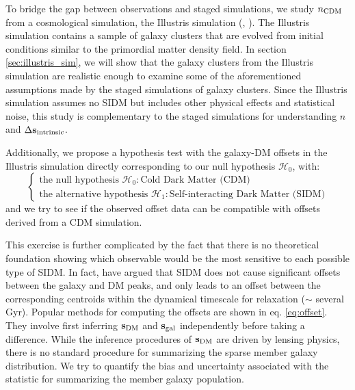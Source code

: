 To bridge the gap between observations and staged simulations, we
study $n_{\rm CDM}$ from a cosmological simulation, the Illustris simulation
(\citealt{Vogelsberger2014}, \citealt{Genel2014a}). 
The Illustris simulation contains a sample of galaxy clusters that are evolved
from initial conditions similar to the primordial
matter density field. In section \ref{sec:illustris_sim},
we will show that the galaxy clusters from the Illustris simulation 
are realistic enough to examine some of the aforementioned assumptions made by the
staged simulations of galaxy clusters. Since the Illustris simulation assumes no SIDM but 
includes other physical effects and statistical noise, 
this study is complementary to the 
staged simulations for understanding $n$ and $\Delta {\bf s}_{\rm intrinsic}$. 

Additionally, we propose a hypothesis test with the galaxy-DM offsets in
the Illustris simulation directly corresponding to our null hypothesis
$\mathcal{H}_0$, with: 
\begin{equation}
\begin{cases}
	\text{the null hypothesis }\mathcal{H}_0: \text{Cold Dark Matter (CDM)} \\
	\text{the alternative hypothesis }\mathcal{H}_1: \text{Self-interacting Dark
	Matter (SIDM)} 
\end{cases}
\end{equation}
and we try to see if the observed offset data can be compatible with offsets
derived from a CDM simulation. 


This exercise is further complicated by the fact that there is no theoretical
foundation showing which observable would be the most sensitive to each
possible type of SIDM. In fact, \cite{Kahlhoefer14} have argued that SIDM 
does not cause
significant offsets between the galaxy and DM peaks, and only leads to an offset
between the corresponding centroids within the dynamical timescale for
relaxation ($\sim$ several Gyr). 
Popular methods for computing the offsets are shown in eq. \ref{eq:offset}.
They involve first inferring ${\bf s}_{\rm DM}$ 
and ${\bf s}_{\rm gal}$ independently before taking a difference.
While the inference procedures of ${\bf s}_{\rm DM}$ are driven by lensing 
physics, there is no standard procedure for
summarizing the sparse member galaxy distribution. 
We try to quantify the bias and uncertainty associated with the
statistic for summarizing the member galaxy population. 

